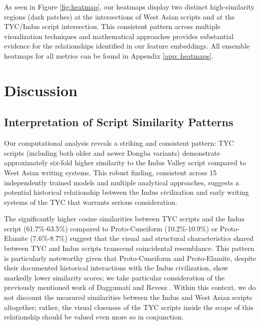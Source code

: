 \documentclass[11pt,a4paper,oneside]{report}
\begin{document}
As seen in Figure \ref{fig:heatmap}, our heatmaps display two distinct high-similarity regions (dark patches) at the intersections of West Asian scripts and at the TYC/Indus script intersection. This consistent pattern across multiple visualization techniques and mathematical approaches provides substantial evidence for the relationships identified in our feature embeddings. All ensemble heatmaps for all metrics can be found in Appendix \ref{app: heatmaps}.

\chapter{Discussion}
\label{discussion}
\section{Interpretation of Script Similarity Patterns}
\noindent\hspace{1cm}
Our computational analysis reveals a striking and consistent pattern: TYC scripts (including both older and newer Dongba variants) demonstrate approximately six-fold higher similarity to the Indus Valley script compared to West Asian writing systems. This robust finding, consistent across 15 independently trained models and multiple analytical approaches, suggests a potential historical relationship between the Indus civilization and early writing systems of the TYC that warrants serious consideration.

The significantly higher cosine similarities between TYC scripts and the Indus script (61.7\%-63.5\%) compared to Proto-Cuneiform (10.2\%-10.9\%) or Proto-Elamite (7.6\%-8.7\%) suggest that the visual and structural characteristics shared between TYC and Indus scripts transcend coincidental resemblance. This pattern is particularly noteworthy given that Proto-Cuneiform and Proto-Elamite, despite their documented historical interactions with the Indus civilization, show markedly lower similarity scores; we take particular consideration of the previously mentioned work of Daggumati and Revesz \cite{daggumati_convolutional_2023, daggumati_data_2018, daggumati_data_2019}. Within this context, we do not discount the measured similarities between the Indus and West Asian scripts altogether; rather, the visual closeness of the TYC scripts inside the scope of this relationship should be valued even more so in conjunction.
\end{document}
